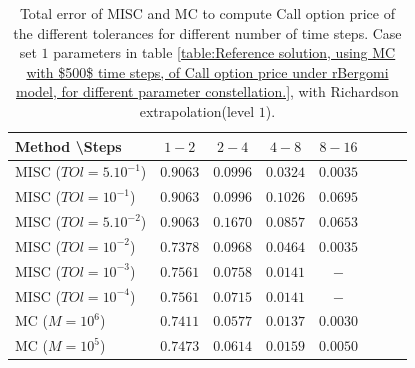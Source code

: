 \documentclass[11pt]{article}
\begin{document}
\begin{table}[!h]
	\centering
	\begin{tabular}{l*{6}{c}r}
		Method \textbackslash  Steps            & $1-2$ & $2-4$ & $4-8$ & $8-16$  \\
		\hline
		MISC ($TOl=5.10^{-1}$)  & $\mathbf{0.9063
		}$ & $\mathbf{ 0.0996}$ & $\mathbf{0.0324
		}$ & $\mathbf{ 0.0035}$ \\
		MISC ($TOl=10^{-1}$)  & $\mathbf{0.9063
		}$ & $\mathbf{ 0.0996}$ & $\mathbf{  0.1026}$ & $\mathbf{ 0.0695
		}$  \\
		MISC ($TOl=5.10^{-2}$)  & $\mathbf{0.9063
		}$ & $\mathbf{    0.1670}$ & $\mathbf{ 0.0857}$ & $\mathbf{0.0653
		}$  \\
		MISC ($TOl=10^{-2}$)  & $\mathbf{0.7378}$ & $\mathbf{  0.0968}$ & $\mathbf{   0.0464}$ & $\mathbf{ 0.0035}$  \\	
		MISC ($TOl=10^{-3}$)  & $\mathbf{0.7561}$ & $\mathbf{0.0758}$ & $\mathbf{0.0141}$ & $\mathbf{-}$  \\
		MISC ($TOl=10^{-4}$)  & $\mathbf{0.7561}$ & $\mathbf{0.0715}$ & $\mathbf{0.0141}$ & $\mathbf{-}$  \\
		\hline
		MC ($M=10^6$)  & $\mathbf{0.7411}$  & $\mathbf{ 0.0577}$  & $\mathbf{  0.0137}$ &$\mathbf{  0.0030}$   \\	
		MC ($M=10^5$)  & $\mathbf{0.7473}$  & $\mathbf{ 0.0614}$  & $\mathbf{  0.0159}$ &$\mathbf{  0.0050}$   \\
		\hline
	\end{tabular}
	\caption{Total  error of MISC and MC to compute Call option price of the different tolerances for different number of time steps. Case set $1$ parameters in table \ref{table:Reference solution, using MC with $500$ time steps, of Call option price under rBergomi model, for different parameter constellation.}, with Richardson extrapolation(level $1$).}
	\label{Total  error of MISC and MC to compute Call option price of the different tolerances for different number of time steps. Case set $1$ parameters, with Richardson extrapolation(level $1$). The numbers between parentheses are the corresponding absolute errors.}
\end{table}
\end{document}
